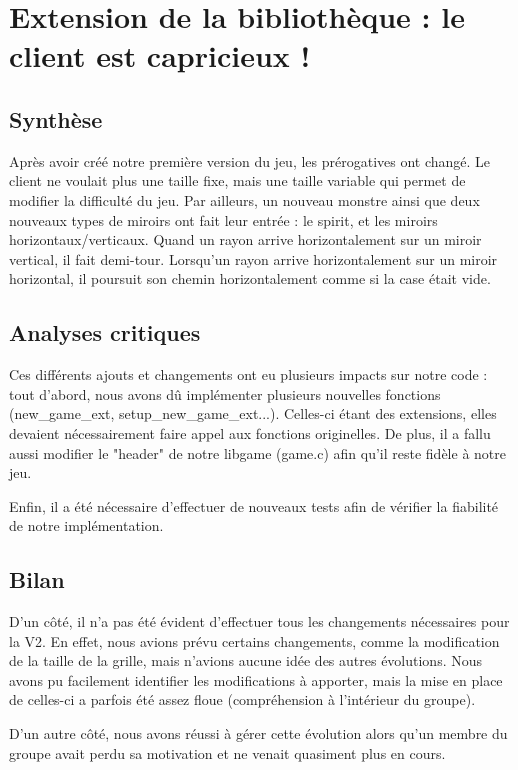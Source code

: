 \documentclass[12pt]{article}
\begin{document}
\section{Extension de la bibliothèque : le client est capricieux ! }
\subsection{Synthèse}
Après avoir créé notre première version du jeu, les prérogatives ont changé. Le client ne voulait plus une taille fixe, mais une taille variable qui permet de modifier la difficulté du jeu. Par ailleurs, un nouveau monstre ainsi que deux nouveaux types de miroirs ont fait leur entrée : le spirit, et les miroirs horizontaux/verticaux. Quand un rayon arrive horizontalement sur un miroir vertical, il fait demi-tour. Lorsqu'un rayon arrive horizontalement sur un miroir horizontal, il poursuit son chemin horizontalement comme si la case était vide.

\subsection{Analyses critiques}
Ces différents ajouts et changements ont eu plusieurs impacts sur notre code : tout d'abord, nous avons dû implémenter plusieurs nouvelles fonctions (new\_game\_ext, setup\_new\_game\_ext...). Celles-ci étant des extensions, elles devaient nécessairement faire appel aux fonctions originelles. De plus, il a fallu aussi modifier le "header" de notre libgame (game.c) afin qu'il reste fidèle à notre jeu.

Enfin, il a été nécessaire d'effectuer de nouveaux tests afin de vérifier la fiabilité de notre implémentation.

\subsection{Bilan}
D'un côté, il n'a pas été évident d'effectuer tous les changements nécessaires pour la V2. En effet, nous avions prévu certains changements, comme la modification de la taille de la grille, mais n'avions aucune idée des autres évolutions. Nous avons pu facilement identifier les modifications à apporter, mais la mise en place de celles-ci a parfois été assez floue (compréhension à l'intérieur du groupe).

D'un autre côté, nous avons réussi à gérer cette évolution alors qu'un membre du groupe avait perdu sa motivation et ne venait quasiment plus en cours.
\end{document}
